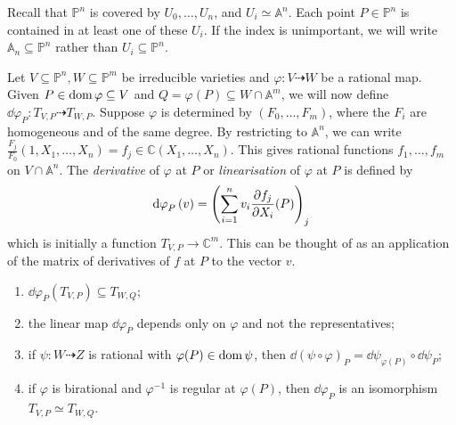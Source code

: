 Recall that \( \mathbb P^n \) is covered by \( U_0, \dots, U_n \), and \( U_i \simeq \mathbb A^n \).
Each point \( P \in \mathbb P^n \) is contained in at least one of these \( U_i \).
If the index is unimportant, we will write \( \mathbb A_n \subseteq \mathbb P^n \) rather than \( U_i \subseteq \mathbb P^n \).

Let \( V \subseteq \mathbb P^n, W \subseteq \mathbb P^m \) be irreducible varieties and \( \varphi \colon V \dashrightarrow W \) be a rational map.
Given \( P \in \operatorname{dom} \varphi \subseteq V \) and \( Q = \varphi(P) \subseteq W \cap \mathbb A^m \), we will now define \( \dd{\varphi}_P \colon T_{V,P} \dashrightarrow T_{W,P} \).
Suppose \( \varphi \) is determined by \( (F_0, \dots, F_m) \), where the \( F_i \) are homogeneous and of the same degree.
By restricting to \( \mathbb A^n \), we can write \( \frac{F_j}{F_0}(1, X_1, \dots, X_n) = f_j \in \mathbb C(X_1, \dots, X_n) \).
This gives rational functions \( f_1, \dots, f_m \) on \( V \cap \mathbb A^n \).
The \emph{derivative} of \( \varphi \) at \( P \) or \emph{linearisation} of \( \varphi \) at \( P \) is defined by
\[ \dd{\varphi}_P(v) = \qty(\sum_{i=1}^n v_i \pdv{f_j}{X_i}\qty(P))_j \]
which is initially a function \( T_{V,P} \to \mathbb C^m \).
This can be thought of as an application of the matrix of derivatives of \( f \) at \( P \) to the vector \( v \).
\begin{proposition}
    \begin{enumerate}
        \item \( \dd{\varphi}_P(T_{V,P}) \subseteq T_{W,Q} \);
        \item the linear map \( \dd{\varphi}_P \) depends only on \( \varphi \) and not the representatives;
        \item if \( \psi \colon W \dashrightarrow Z \) is rational with \( \varphi(P) \in \operatorname{dom} \psi \), then \( \dd{(\psi \circ \varphi)}_P = \dd{\psi}_{\varphi(P)} \circ \dd{\psi}_P \);
        \item if \( \varphi \) is birational and \( \varphi^{-1} \) is regular at \( \varphi(P) \), then \( \dd{\varphi}_P \) is an isomorphism \( T_{V,P} \simeq T_{W,Q} \).
    \end{enumerate}
\end{proposition}
